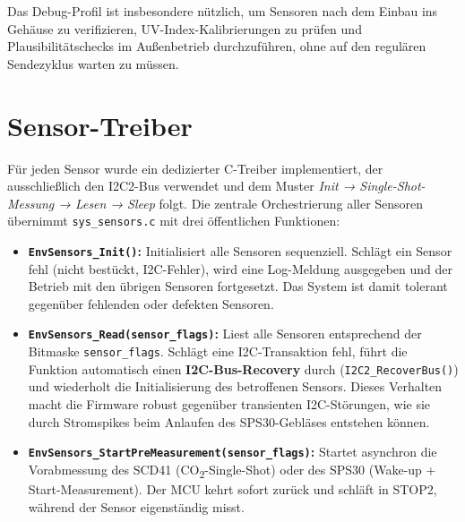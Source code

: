 Das Debug-Profil ist insbesondere nützlich, um Sensoren nach dem Einbau ins Gehäuse zu verifizieren, UV-Index-Kalibrierungen zu prüfen und Plausibilitätschecks im Außenbetrieb durchzuführen, ohne auf den regulären Sendezyklus warten zu müssen.

\section*{Sensor-Treiber}

Für jeden Sensor wurde ein dedizierter C-Treiber implementiert, der ausschließlich den I2C2-Bus verwendet und dem Muster \textit{Init → Single-Shot-Messung → Lesen → Sleep} folgt. Die zentrale Orchestrierung aller Sensoren übernimmt \texttt{sys\_sensors.c} mit drei öffentlichen Funktionen:

\begin{itemize}
  \item \textbf{\texttt{EnvSensors\_Init()}:} Initialisiert alle Sensoren sequenziell. Schlägt ein Sensor fehl (nicht bestückt, I2C-Fehler), wird eine Log-Meldung ausgegeben und der Betrieb mit den übrigen Sensoren fortgesetzt. Das System ist damit tolerant gegenüber fehlenden oder defekten Sensoren.

  \item \textbf{\texttt{EnvSensors\_Read(sensor\_flags)}:} Liest alle Sensoren entsprechend der Bitmaske \texttt{sensor\_flags}. Schlägt eine I2C-Transaktion fehl, führt die Funktion automatisch einen \textbf{I2C-Bus-Recovery} durch (\texttt{I2C2\_RecoverBus()}) und wiederholt die Initialisierung des betroffenen Sensors. Dieses Verhalten macht die Firmware robust gegenüber transienten I2C-Störungen, wie sie durch Stromspikes beim Anlaufen des SPS30-Gebläses entstehen können.

  \item \textbf{\texttt{EnvSensors\_StartPreMeasurement(sensor\_flags)}:} Startet asynchron die Vorabmessung des SCD41 (CO\textsubscript{2}-Single-Shot) oder des SPS30 (Wake-up + Start-Measurement). Der MCU kehrt sofort zurück und schläft in STOP2, während der Sensor eigenständig misst.
\end{itemize}
